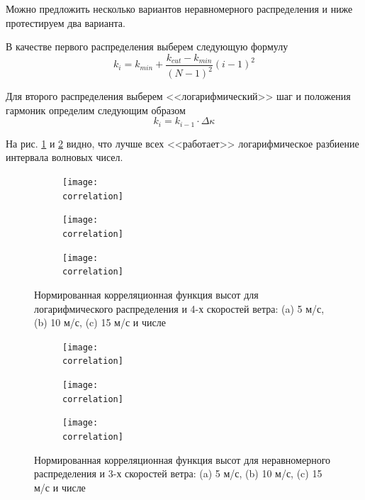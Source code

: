 Можно предложить несколько вариантов неравномерного распределения и ниже
протестируем два варианта.

В качестве первого распределения выберем следующую формулу
\begin{equation}
    k_i = k_{min} + \frac{k_{cut} - k_{min}}{(N-1)^2} (i-1)^2
\end{equation}

Для второго распределения выберем <<логарифмический>> шаг и положения гармоник
определим следующим образом
\begin{equation}
    k_i = k_{i-1} \cdot \Delta  \kappa
\end{equation}

На рис. \ref{fig:corr_h_quad} и \ref{fig:corr_h_log} видно, что лучше всех
<<работает>> логарифмическое разбиение интервала волновых чисел.
\begin{figure}[H]
    \centering
    \begin{subfigure}{0.49\linewidth}
        \centering
        \texttt{[image: \\correlation]}
    \end{subfigure}
    \hfill
    \begin{subfigure}{0.49\linewidth}
        \centering
        \texttt{[image: \\correlation]}
    \end{subfigure}
    \begin{subfigure}{0.49\linewidth}
        \centering
        \texttt{[image: \\correlation]}
    \end{subfigure}
    \caption{Нормированная корреляционная функция высот для логарифмического распределения и
    4-х скоростей ветра: (a) 5 м/с,  (b) 10 м/с, (c) 15 м/с и числе}
    \label{fig:corr_h_quad}
\end{figure}


\begin{figure}[ht]
    \centering
    \begin{subfigure}{0.49\linewidth}
        \centering
        \texttt{[image: \\correlation]}
    \end{subfigure}
    \hfill
    \begin{subfigure}{0.49\linewidth}
        \centering
        \texttt{[image: \\correlation]}
    \end{subfigure}
    \begin{subfigure}{0.49\linewidth}
        \centering
        \texttt{[image: \\correlation]}
    \end{subfigure}
    \caption{Нормированная корреляционная функция высот для неравномерного распределения и
    3-х скоростей ветра: (a) 5 м/с,  (b) 10 м/с, (c) 15 м/с и числе}
    \label{fig:corr_h_log}
\end{figure}

